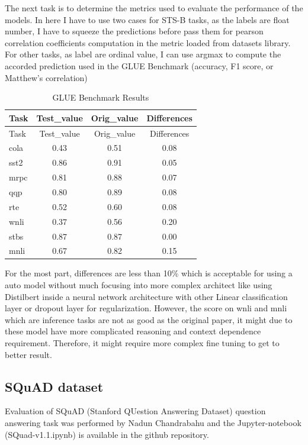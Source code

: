 \documentclass[
  11pt,
]{article}
\begin{document}
The next task is to determine the metrics used to evaluate the
performance of the models. In here I have to use two cases for STS-B
tasks, as the labels are float number, I have to squeeze the predictions
before pass them for pearson correlation coefficients computation in the
metric loaded from datasets library. For other tasks, as label are
ordinal value, I can use argmax to compute the accorded prediction used
in the GLUE Benchmark (accuracy, F1 score, or Matthew's correlation)

\begin{longtable}[]{@{}lccc@{}}
\caption{GLUE Benchmark Results}\tabularnewline
\toprule\noalign{}
Task & Test\_value & Orig\_value & Differences \\
\midrule\noalign{}
\endfirsthead
\toprule\noalign{}
Task & Test\_value & Orig\_value & Differences \\
\midrule\noalign{}
\endhead
\bottomrule\noalign{}
\endlastfoot
cola & 0.43 & 0.51 & 0.08 \\
sst2 & 0.86 & 0.91 & 0.05 \\
mrpc & 0.81 & 0.88 & 0.07 \\
qqp & 0.80 & 0.89 & 0.08 \\
rte & 0.52 & 0.60 & 0.08 \\
wnli & 0.37 & 0.56 & 0.20 \\
stbs & 0.87 & 0.87 & 0.00 \\
mnli & 0.67 & 0.82 & 0.15 \\
\end{longtable}

For the most part, differences are less than 10\% which is acceptable
for using a auto model without much focusing into more complex architect
like using Distilbert inside a neural network architecture with other
Linear classification layer or dropout layer for regularization.
However, the score on wnli and mnli which are inference tasks are not as
good as the original paper, it might due to these model have more
complicated reasoning and context dependence requirement. Therefore, it
might require more complex fine tuning to get to better result.

\subsection{SQuAD dataset}\label{squad-dataset-1}

Evaluation of SQuAD (Stanford QUestion Answering Dataset) question
answering task was performed by Nadun Chandrabahu and the
Jupyter-notebook (SQuad-v1.1.ipynb) is available in the github
repository.
\end{document}
